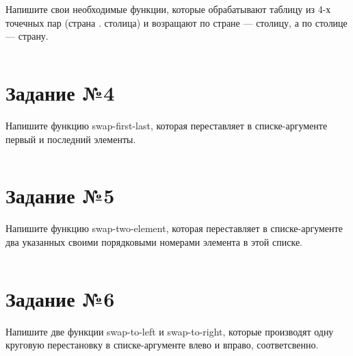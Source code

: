 Напишите свои необходимые функции, которые обрабатывают таблицу из 4-х точечных
пар (страна . столица) и возращают по стране --- столицу, а по столице ---
страну.

\vspace{4mm}
\begin{minipage}{0.92\linewidth}
\begin{lstlisting}
\end{lstlisting}
\end{minipage}

\section{Задание №4}

Напишите функцию swap-first-last, которая переставляет в списке-аргументе
первый и последний элементы.

\vspace{4mm}
\begin{minipage}{0.92\linewidth}
\begin{lstlisting}
\end{lstlisting}
\end{minipage}


\section{Задание №5}

Напишите функцию swap-two-element, которая переставляет в списке-аргументе
два указанных своими порядковыми номерами элемента в этой списке.

\vspace{4mm}
\begin{minipage}{0.92\linewidth}
\begin{lstlisting}
\end{lstlisting}
\end{minipage}

\section{Задание №6}

Напишите две функции swap-to-left и swap-to-right, которые производят одну
круговую перестановку в списке-аргументе влево и вправо, соответсвенно.

\vspace{4mm}
\begin{minipage}{0.92\linewidth}
\begin{lstlisting}
\end{lstlisting}
\end{minipage}


